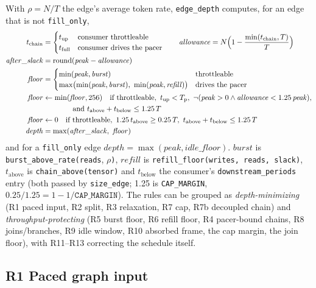 \documentclass[10pt,a4paper]{article}
\newcommand{\code}[1]{\texttt{#1}}
\newcommand{\Tg}{T}           %
\newcommand{\Tp}{T_{\mathrm{p}}} %
\newcommand{\NF}{N}            %
\begin{document}
With $\rho=\NF/\Tg$ the edge's average token rate, \code{edge\_depth} computes, for an
edge that is not \code{fill\_only},
\begin{align*}
t_{\mathrm{chain}} &= \begin{cases} t_{\mathrm{up}} & \text{consumer throttleable}\\ t_{\mathrm{full}} & \text{consumer drives the pacer}\end{cases}
\qquad
\mathit{allowance} = \NF\Bigl(1-\frac{\min(t_{\mathrm{chain}},\Tg)}{\Tg}\Bigr)\\
\mathit{after\_slack} &= \mathrm{round}(\mathit{peak}-\mathit{allowance})\\
\mathit{floor} &= \begin{cases}\min(\mathit{peak},\mathit{burst}) & \text{throttleable}\\
  \max\bigl(\min(\mathit{peak},\mathit{burst}),\ \min(\mathit{peak},\mathit{refill})\bigr) & \text{drives the pacer}\end{cases}\\
\mathit{floor} &\leftarrow \min(\mathit{floor}, 256)\quad\text{if throttleable},\ t_{\mathrm{up}}<\Tp,\ \neg(\mathit{peak}>0\wedge \mathit{allowance}<1.25\,\mathit{peak}),\\
  &\qquad\qquad\text{and }t_{\mathrm{above}}+t_{\mathrm{below}}\le1.25\,\Tg\\
\mathit{floor} &\leftarrow 0\quad\text{if throttleable},\ 1.25\,t_{\mathrm{above}}\ge0.25\,\Tg,\ t_{\mathrm{above}}+t_{\mathrm{below}}\le1.25\,\Tg\\
\mathit{depth} &= \max(\mathit{after\_slack},\ \mathit{floor})
\end{align*}
and for a \code{fill\_only} edge $\mathit{depth}=\max(\mathit{peak},\mathit{idle\_floor})$.
$\mathit{burst}$ is \code{burst\_above\_rate(reads}, $\rho$\code{)}, $\mathit{refill}$
is \code{refill\_floor(writes, reads, slack)}, $t_{\mathrm{above}}$ is
\code{chain\_above(tensor)} and $t_{\mathrm{below}}$ the consumer's
\code{downstream\_periods} entry (both passed by \code{size\_edge}; 1.25 is
\code{CAP\_MARGIN}, $0.25/1.25=1-1/\code{CAP\_MARGIN}$). The rules can be grouped as
\emph{depth-minimizing} (R1 paced input, R2 split, R3 relaxation, R7 cap, R7b
decoupled chain) and
\emph{throughput-protecting} (R5 burst floor, R6 refill floor, R4 pacer-bound
chains, R8 joins/branches, R9 idle window, R10 absorbed frame, the cap margin,
the join floor), with R11--R13 correcting the schedule itself.

\subsection{R1 Paced graph input}
\end{document}
